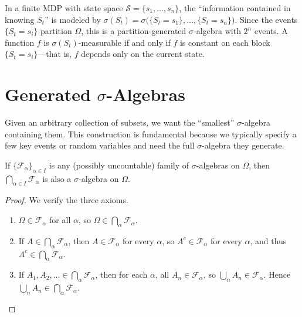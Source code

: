 \documentclass[11pt,a4paper]{article}
\begin{document}
\begin{rlconnection}[title={Partition $\sigma$-Algebras in RL}]
In a finite MDP with state space $\mathcal{S} = \{s_1, \ldots, s_n\}$,
the ``information contained in knowing $S_t$'' is modeled by
$\sigma(S_t) = \sigma\bigl(\{S_t = s_1\}, \ldots, \{S_t = s_n\}\bigr)$.
Since the events $\{S_t = s_i\}$ partition $\Omega$, this is a
partition-generated $\sigma$-algebra with $2^n$ events. A function $f$ is
$\sigma(S_t)$-measurable if and only if $f$ is constant on each block
$\{S_t = s_i\}$---that is, $f$ depends only on the current state.
\end{rlconnection}


\section{Generated $\sigma$-Algebras}
\label{sec:generated}

Given an arbitrary collection of subsets, we want the ``smallest''
$\sigma$-algebra containing them. This construction is fundamental
because we typically specify a few key events or random variables and
need the full $\sigma$-algebra they generate.

\begin{lemma}
\label{lem:intersection}
If $\{\mathcal{F}_\alpha\}_{\alpha \in I}$ is any (possibly uncountable)
family of $\sigma$-algebras on $\Omega$, then
$\bigcap_{\alpha \in I} \mathcal{F}_\alpha$ is also a $\sigma$-algebra
on $\Omega$.
\end{lemma}

\begin{proof}
We verify the three axioms.
\begin{enumerate}[nosep,label=(\roman*)]
  \item $\Omega \in \mathcal{F}_\alpha$ for all $\alpha$, so
    $\Omega \in \bigcap_\alpha \mathcal{F}_\alpha$.
  \item If $A \in \bigcap_\alpha \mathcal{F}_\alpha$, then
    $A \in \mathcal{F}_\alpha$ for every $\alpha$, so
    $A^c \in \mathcal{F}_\alpha$ for every $\alpha$, and thus
    $A^c \in \bigcap_\alpha \mathcal{F}_\alpha$.
  \item If $A_1, A_2, \ldots \in \bigcap_\alpha \mathcal{F}_\alpha$, then
    for each $\alpha$, all $A_n \in \mathcal{F}_\alpha$, so
    $\bigcup_n A_n \in \mathcal{F}_\alpha$. Hence
    $\bigcup_n A_n \in \bigcap_\alpha \mathcal{F}_\alpha$.
    \qedhere
\end{enumerate}
\end{proof}
\end{document}
